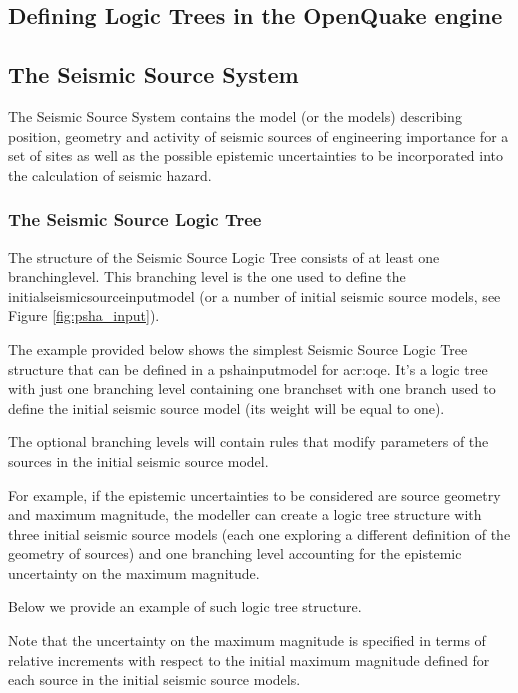 \subsection{Defining Logic Trees in the OpenQuake engine}

\subsection{The Seismic Source System}
The Seismic Source System contains the model (or the models) describing 
position, geometry 
and activity of seismic sources of engineering importance for a set of sites
as well as the possible epistemic uncertainties to be incorporated into the 
calculation of seismic hazard.
%
\subsubsection{The Seismic Source Logic Tree}
The structure of the Seismic Source Logic Tree consists of at least one 
\gls{branchinglevel}. This branching level is the one used to define the 
\gls{initialseismicsourceinputmodel} (or a number of initial seismic source 
models, see Figure \ref{fig:psha_input}). 

The example provided below shows the simplest Seismic Source Logic Tree 
structure that can be defined in a \gls{pshainputmodel} for \gls{acr:oqe}. 
It's a logic tree with just one branching level containing 
one \gls{branchset} with one branch used to define the initial seismic source 
model (its weight will be equal to one).


The optional branching levels will contain rules that modify parameters 
of the sources in the initial seismic source model.

For example, if the epistemic uncertainties to be considered are
source geometry and maximum magnitude, the modeller can create a logic tree
structure with three initial seismic source models (each one exploring a 
different definition of the geometry of sources) and one branching level 
accounting for the epistemic uncertainty on the maximum magnitude.
 
Below we provide an example of such logic tree structure.

Note that the uncertainty on the maximum magnitude is specified in terms 
of relative increments with respect to the initial maximum magnitude 
defined for each source in the initial seismic source models.
%
